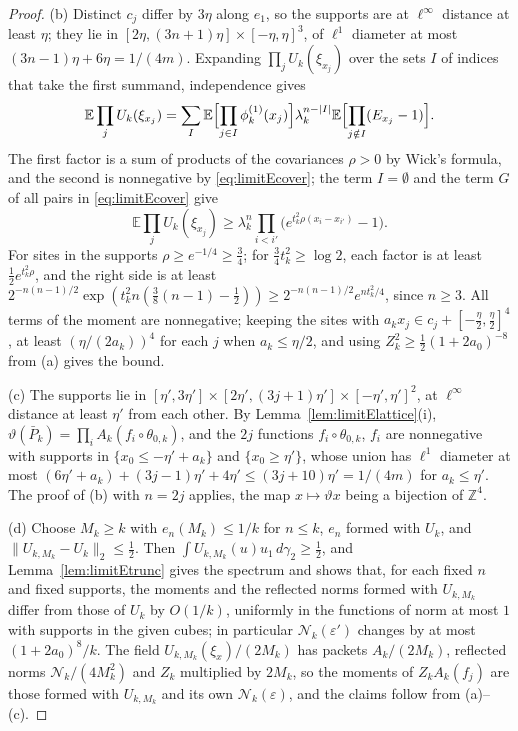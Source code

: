 \documentclass[aps,prd,twocolumn,superscriptaddress,nofootinbib,longbibliography,floatfix,amsmath,amssymb,10pt]{revtex4-2}
\theoremstyle{definition}
\theoremstyle{remark}
\newcommand{\Z}{\mathbb{Z}}
\newcommand{\E}{\mathbb{E}}
\begin{document}
\begin{proof}
(b) Distinct $c_j$ differ by $3\eta$ along $e_1$, so the supports are at
$\ell^\infty$ distance at least $\eta$; they lie in
$[2\eta,(3n+1)\eta]\times[-\eta,\eta]^3$, of $\ell^1$ diameter at most
$(3n-1)\eta+6\eta=1/(4m)$. Expanding $\prod_jU_k(\xi_{x_j})$ over the sets
$I$ of indices that take the first summand, independence gives
\[
\E\prod_jU_k(\xi_{x_j})=\sum_I\E\Bigl[\prod_{j\in I}\phi^{(1)}_k(x_j)\Bigr]
\lambda_k^{n-|I|}\E\Bigl[\prod_{j\notin I}(E_{x_j}-1)\Bigr] .
\]
The first factor is a sum of products of the covariances $\rho>0$ by
Wick's formula, and the second is nonnegative by \eqref{eq:limitEcover};
the term $I=\emptyset$ and the term $G$ of all pairs in
\eqref{eq:limitEcover} give
\[
\E\prod_jU_k(\xi_{x_j})\ge\lambda_k^n\prod_{i<i'}\bigl(e^{t_k^2
\rho(x_i-x_{i'})}-1\bigr).
\]
For sites in the supports $\rho\ge e^{-1/4}\ge\frac34$; for
$\frac34t_k^2\ge\log2$, each factor is at least $\frac12e^{t_k^2\rho}$, and
the right side is at least $2^{-n(n-1)/2}\exp(t_k^2n(\frac38(n-1)-\frac12))
\ge2^{-n(n-1)/2}e^{nt_k^2/4}$, since $n\ge3$. All terms of the moment are
nonnegative; keeping the sites with $a_kx_j\in c_j+[-\frac\eta2,\frac\eta2]^4$,
at least $(\eta/(2a_k))^4$ for each $j$ when $a_k\le\eta/2$, and using
$Z_k^2\ge\frac12(1+2a_0)^{-8}$ from (a) gives the bound.

(c) The supports lie in $[\eta',3\eta']\times[2\eta',(3j+1)\eta']\times
[-\eta',\eta']^2$, at $\ell^\infty$ distance at least $\eta'$ from each other.
By Lemma~\ref{lem:limitElattice}(i), $\vartheta(\bar P_k)=\prod_iA_k(f_i\circ
\theta_{0,k})$, and the $2j$ functions $f_i\circ\theta_{0,k}$, $f_i$ are
nonnegative with supports in $\{x_0\le-\eta'+a_k\}$ and $\{x_0\ge\eta'\}$,
whose union has $\ell^1$ diameter at most $(6\eta'+a_k)+(3j-1)\eta'+4\eta'
\le(3j+10)\eta'=1/(4m)$ for $a_k\le\eta'$. The proof of (b) with $n=2j$
applies, the map $x\mapsto\vartheta x$ being a bijection of $\Z^4$.

(d) Choose $M_k\ge k$ with $e_n(M_k)\le1/k$ for $n\le k$, $e_n$ formed with
$U_k$, and $\|U_{k,M_k}-U_k\|_2\le\frac12$. Then $\int U_{k,M_k}(u)u_1\,
d\gamma_2\ge\frac12$, and Lemma~\ref{lem:limitEtrunc} gives the spectrum and
shows that, for each fixed $n$ and fixed supports, the moments and the
reflected norms formed with $U_{k,M_k}$ differ from those of $U_k$ by
$O(1/k)$, uniformly in the functions of norm at most $1$ with supports in
the given cubes; in particular $\mathcal N_k(\varepsilon')$ changes by at
most $(1+2a_0)^8/k$. The field $U_{k,M_k}(\xi_x)/(2M_k)$ has packets
$A_k/(2M_k)$, reflected norms $\mathcal N_k/(4M_k^2)$ and $Z_k$ multiplied
by $2M_k$, so the moments of $Z_kA_k(f_j)$ are those formed with
$U_{k,M_k}$ and its own $\mathcal N_k(\varepsilon)$, and the claims follow
from (a)--(c).
\end{proof}
\end{document}
